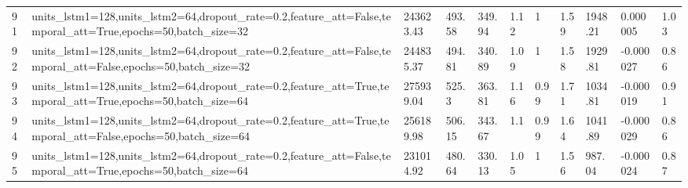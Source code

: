 \begin{longtable}{C{0.8cm} L{2cm} C{1.15cm} C{1.15cm} C{1.15cm} C{1.15cm} C{0.85cm} C{1.25cm} C{1.2cm} C{1.5cm} C{1.0cm}}
91 & units\_lstm1=128,\newline units\_lstm2=64,\newline dropout\_rate=0.2,\newline feature\_att=False,\newline temporal\_att=True,\newline epochs=50,\newline batch\_size=32 & 243623.43 & 493.58 & 349.94 & 1.12 & 1 & 1.59 & 1948.21 & 0.000005 & 1.03 \\
92 & units\_lstm1=128,\newline units\_lstm2=64,\newline dropout\_rate=0.2,\newline feature\_att=False,\newline temporal\_att=False,\newline epochs=50,\newline batch\_size=32 & 244835.37 & 494.81 & 340.89 & 1.09 & 1 & 1.58 & 1929.81 & -0.000027 & 0.86 \\
93 & units\_lstm1=128,\newline units\_lstm2=64,\newline dropout\_rate=0.2,\newline feature\_att=True,\newline temporal\_att=True,\newline epochs=50,\newline batch\_size=64 & 275939.04 & 525.3 & 363.81 & 1.16 & 0.99 & 1.71 & 1034.81 & -0.000019 & 0.91 \\
94 & units\_lstm1=128,\newline units\_lstm2=64,\newline dropout\_rate=0.2,\newline feature\_att=True,\newline temporal\_att=False,\newline epochs=50,\newline batch\_size=64 & 256189.98 & 506.15 & 343.67 & 1.1 & 0.99 & 1.64 & 1041.89 & -0.000029 & 0.86 \\
95 & units\_lstm1=128,\newline units\_lstm2=64,\newline dropout\_rate=0.2,\newline feature\_att=False,\newline temporal\_att=True,\newline epochs=50,\newline batch\_size=64 & 231014.92 & 480.64 & 330.13 & 1.05 & 1 & 1.56 & 987.04 & -0.000024 & 0.87 \\

\end{longtable}
